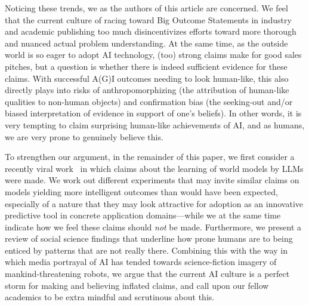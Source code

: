 \documentclass{article}
\theoremstyle{plain}
\theoremstyle{definition}
\theoremstyle{remark}
\begin{document}
Noticing these trends, we as the authors of this article are concerned. We feel that the current culture of racing toward Big Outcome Statements in industry and academic publishing too much disincentivizes efforts toward more thorough and nuanced actual problem understanding. At the same time, as the outside world is so eager to adopt AI technology, (too) strong claims make for good sales pitches, but a question is whether there is indeed sufficient evidence for these claims. With successful A(G)I outcomes needing to look human-like, this also directly plays into risks of anthropomorphizing (the attribution of human-like qualities to non-human objects) and confirmation bias (the seeking-out and/or biased interpretation of evidence in support of one's beliefs). In other words, it is very tempting to claim surprising human-like achievements of AI, and as humans, we are very prone to genuinely believe this.

To strengthen our argument, in the remainder of this paper, we first consider a recently viral work~\cite{gurnee2023languagev2} in which claims about the learning of world models by LLMs were made. We work out different experiments that may invite similar claims on models yielding more intelligent outcomes than would have been expected, especially of a nature that they may look attractive for adoption as an innovative predictive tool in concrete application domains---while we at the same time indicate how we feel these claims should \emph{not} be made. Furthermore, we present a review of social science findings that underline how prone humans are to being enticed by patterns that are not really there. Combining this with the way in which media portrayal of AI has tended towards science-fiction imagery of mankind-threatening robots, we argue that the current AI culture is a perfect storm for making and believing inflated claims, and call upon our fellow academics to be extra mindful and scrutinous about this.


\end{document}
